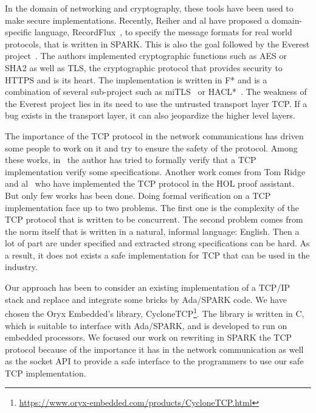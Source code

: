 \documentclass[runningheads]{llncs}
\begin{document}
    In the domain of networking and cryptography, these tools have been used to make secure implementations.
    Recently, Reiher and al have proposed a domain-specific language, RecordFlux~\cite{Reiher2019RecordFluxFM},
    to specify the message formats for real world protocols, that is written in SPARK.
    This is also the goal followed by the Everest project~\cite{bhargavan2017everest}.
    The authors implemented cryptographic functions such as AES or
    SHA2 as well as TLS, the cryptographic protocol that provides security
    to HTTPS and is its heart. The implementation is written
    in F* and is a combination of several sub-project such as miTLS~\cite{bhargavan2013implementing}
    or HACL*~\cite{zinzindohoue2017hacl}. The weakness of the Everest project lies in its need to use the untrusted
    transport layer TCP. If a bug exists in the transport layer, it can also jeopardize the higher level layers.

    The importance of the TCP protocol in the network communications has driven some people to work
    on it and try to ensure the safety of the protocol. Among these works, in~\cite{smith1996formal}
    the author has tried to formally verify that a TCP implementation verify some specifications.
    Another work comes from Tom Ridge and al~\cite{ridge2008rigorous} who have implemented the TCP
    protocol in the HOL proof assistant.
    But only few works has been done. Doing formal verification on a TCP implementation face up to two
    problems. The first one is the complexity of the TCP protocol that is written to be concurrent.
    The second problem comes from the norm itself that is written in a natural, informal language: English.
    Then a lot of part are under specified and extracted strong specifications can be hard.
    As a result, it does not exists a safe implementation for TCP that can be used in the industry.

    Our approach has been to consider an existing implementation of a TCP/IP stack and replace and integrate
    some bricks by Ada/SPARK code.
    We have chosen the Oryx Embedded's library, CycloneTCP\footnote{\url{https://www.oryx-embedded.com/products/CycloneTCP.html}}.
    The library is written in C, which is suitable to interface with Ada/SPARK, and is developed to run
    on embedded processors. We focused our work on rewriting in SPARK the TCP protocol because of the importance
    it has in the network communication as well as the socket API to provide a safe interface to the programmers
    to use our safe TCP implementation.
\end{document}
